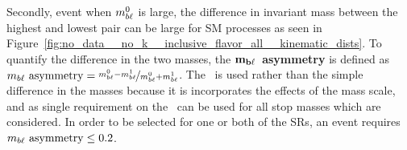 \begin{description}
    Secondly, event when $m_{b\ell}^{0}$ is large, the difference in invariant mass
    between the highest and lowest pair can be large for SM processes as seen
    in 
    Figure~\ref{fig:no_data__no_k__inclusive_flavor_all__kinematic_dists}.
    To quantify the difference in the two masses, the
    $\mathbf{m_{b\ell}}$~\textbf{asymmetry} is defined as
    $m_{b\ell}~\mathrm{asymmetry} = \nicefrac{m_{b\ell}^0-m_{b\ell}^1}{m_{b\ell}^0+m_{b\ell}^1}$.
    The \MBLASYM\ is used rather than the simple difference in the masses
    because it is incorporates the effects of the mass scale, and as single
    requirement on the \MBLASYM\ can be used for all stop masses which are
    considered.
    In order to be selected for one or both of the SRs, an event requires
    $m_{b\ell}~\mathrm{asymmetry} \leq 0.2$.
\end{description}



